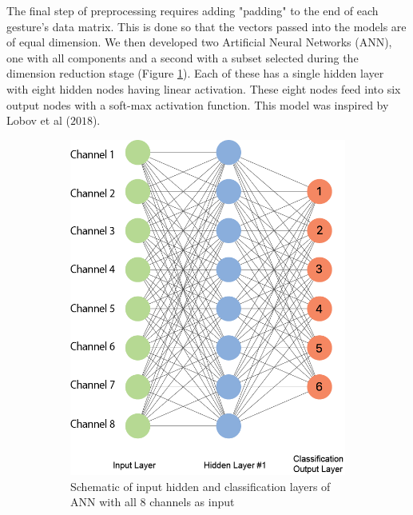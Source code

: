 \documentclass{article}
\begin{document}
The final step of preprocessing requires adding "padding" to the end of each gesture's data matrix. This is done so that the vectors passed into the models are of equal dimension. We then developed two Artificial Neural Networks (ANN), one with all components and a second with a subset selected during the dimension reduction stage (Figure \ref{fig:1Layer}). Each of these has a single hidden layer with eight hidden nodes having linear activation. These eight nodes feed into six output nodes with a soft-max activation function. This model was inspired by Lobov et al ($2018$).

\begin{figure}[h]
\centering
\begin{subfigure}{.5\textwidth}
  \centering
  \includegraphics[width=.9\linewidth]{Graphics/1-layer-NN}
  \caption{Schematic of input hidden and classification layers of ANN with all 8 channels as input}
  \label{fig:1Layer}
\end{subfigure}%
\begin{subfigure}{.6\textwidth}
  \centering

\end{subfigure}
\end{figure}
\end{document}
